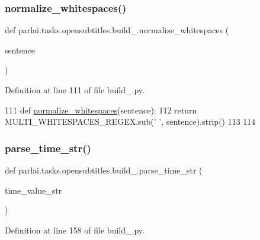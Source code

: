 \subsubsection{\texorpdfstring{normalize\+\_\+whitespaces()}{normalize\_whitespaces()}}
{\footnotesize\ttfamily def parlai.\+tasks.\+opensubtitles.\+build\+\_.\+normalize\+\_\+whitespaces (\begin{DoxyParamCaption}\item[{}]{sentence }\end{DoxyParamCaption})}



Definition at line 111 of file build\+\_.\+py.


\begin{DoxyCode}
111 \textcolor{keyword}{def }\hyperlink{namespaceparlai_1_1tasks_1_1opensubtitles_1_1build__2018_ae4802978106d19e628d0024c8404cab6}{normalize\_whitespaces}(sentence):
112     \textcolor{keywordflow}{return} MULTI\_WHITESPACES\_REGEX.sub(\textcolor{stringliteral}{' '}, sentence).strip()
113 
114 
\end{DoxyCode}
\mbox{\label{namespaceparlai_1_1tasks_1_1opensubtitles_1_1build__2018_aadc6244a9ec9fec904b712f932ec8b40}} 
\subsubsection{\texorpdfstring{parse\+\_\+time\+\_\+str()}{parse\_time\_str()}}
{\footnotesize\ttfamily def parlai.\+tasks.\+opensubtitles.\+build\+\_.\+parse\+\_\+time\+\_\+str (\begin{DoxyParamCaption}\item[{}]{time\+\_\+value\+\_\+str }\end{DoxyParamCaption})}



Definition at line 158 of file build\+\_.\+py.


